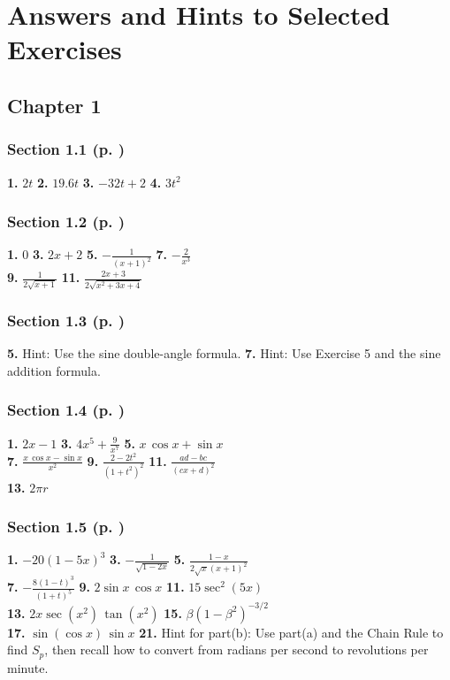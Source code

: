\chapter{Answers and Hints to Selected Exercises}
\begin{multicols*}{2}
\section*{Chapter 1}
\subsection*{Section 1.1 (p. \pageref{sec1dot1})}
\textbf{1.} $2t$ \quad
\textbf{2.} $19.6t$ \quad
\textbf{3.} $-32t+2$ \quad
\textbf{4.} $3t^2$
\subsection*{Section 1.2 (p. \pageref{sec1dot2})}
\textbf{1.} $0$ \quad \textbf{3.} $2x+2$ \quad
\textbf{5.} $-\frac{1}{(x+1)^2}$ \quad
\textbf{7.} $-\frac{2}{x^3}$\\
\textbf{9.} $\frac{1}{2\sqrt{x+1}}$ \quad
\textbf{11.} $\frac{2x+3}{2\sqrt{x^2+3x+4}}$
\subsection*{Section 1.3 (p. \pageref{sec1dot3})}
\textbf{5.} Hint: Use the sine double-angle formula. \quad
\textbf{7.} Hint: Use
Exercise 5 and the sine addition formula.
\subsection*{Section 1.4 (p. \pageref{sec1dot4})}
\textbf{1.} $2x-1$ \quad \textbf{3.} $4x^5 + \frac{9}{x^7}$ \quad
\textbf{5.} $x\,\cos x + \sin x$\\
\textbf{7.} $\frac{x\,\cos x - \sin x}{x^2}$
\quad \textbf{9.} $\frac{2-2t^2}{(1+t^2)^2}$ \quad
\textbf{11.} $\frac{ad-bc}{(cx+d)^2}$\\
\textbf{13.} $2\pi r$
\subsection*{Section 1.5 (p. \pageref{sec1dot5})}
\textbf{1.} $-20(1-5x)^3$ \quad \textbf{3.} $-\frac{1}{\sqrt{1-2x}}$ \quad
\textbf{5.} $\frac{1-x}{2\sqrt{x}(x+1)^2}$\\
\textbf{7.} $-\frac{8(1-t)^3}{(1+t)^5}$
\textbf{9.} $2\sin x \,\cos x$ \quad
\textbf{11.} $15\sec^2(5x)$\\
\textbf{13.} $2x\sec (x^2)\,\tan (x^2)$ \quad
\textbf{15.} $\beta (1-\beta^2)^{-3/2}$\\
\textbf{17.} $\sin (\cos x)\,\sin x$ \quad
\textbf{21.} Hint for part(b): Use part(a) and the
Chain Rule to find $S_p$, then recall how to convert from radians per second to
revolutions per minute.

\end{multicols*}
